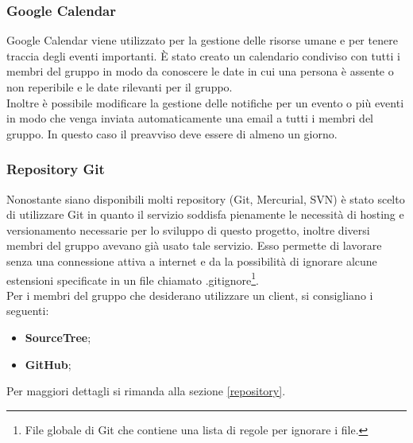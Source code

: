 \subsubsection{Google Calendar}
\gls{Google Calendar} viene utilizzato per la gestione delle risorse umane e per tenere traccia degli eventi importanti. È stato creato un calendario condiviso con tutti i membri del gruppo in modo da conoscere le date in cui una persona è assente o non reperibile e le date rilevanti per il gruppo.\\
Inoltre è possibile modificare la gestione delle notifiche per un evento o più eventi in modo che venga inviata automaticamente una email a tutti i membri del gruppo. In questo caso il preavviso deve essere di almeno un giorno.

\subsubsection{Repository Git}

Nonostante siano disponibili molti \gls{repository} (\gls{Git}, \gls{Mercurial}, \gls{SVN}) è stato scelto di utilizzare \gls{Git} in quanto il servizio soddisfa pienamente le necessità di \gls{hosting} e \gls{versionamento} necessarie per lo sviluppo di questo progetto, inoltre diversi membri del gruppo avevano già usato tale servizio. Esso permette di lavorare senza una connessione attiva a internet e da la possibilità di ignorare alcune estensioni specificate in un file chiamato .gitignore\footnote{File globale di \gls{Git} che contiene una lista di regole per ignorare i file.}.\\ Per i membri del gruppo che desiderano utilizzare un client, si consigliano i seguenti:
\begin{itemize}
	\item \textbf{SourceTree};
	\item \textbf{\gls{GitHub}};
\end{itemize}
Per maggiori dettagli si rimanda alla sezione \ref{repository}.

\newpage
